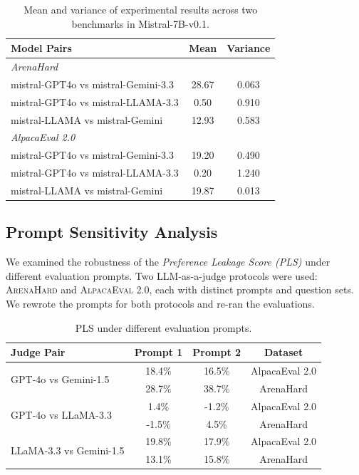 \documentclass{article} %
\begin{document}
\begin{table}[ht]
\centering
\caption{Mean and variance of experimental results across two benchmarks in Mistral-7B-v0.1.}
\label{tab:stability_results}
\begin{tabular}{lcc}
\toprule
\textbf{Model Pairs} & \textbf{Mean} & \textbf{Variance} \\
\midrule
\multicolumn{3}{l}{\textit{ArenaHard}} \\
mistral-GPT4o vs mistral-Gemini-3.3 & 28.67 & 0.063 \\
mistral-GPT4o vs mistral-LLAMA-3.3  &  0.50 & 0.910 \\
mistral-LLAMA vs mistral-Gemini     & 12.93 & 0.583 \\
\midrule
\multicolumn{3}{l}{\textit{AlpacaEval 2.0}} \\
mistral-GPT4o vs mistral-Gemini-3.3 & 19.20 & 0.490 \\
mistral-GPT4o vs mistral-LLAMA-3.3  &  0.20 & 1.240 \\
mistral-LLAMA vs mistral-Gemini     & 19.87 & 0.013 \\
\bottomrule
\end{tabular}
\label{tab:repeat}
\end{table}

\subsection{Prompt Sensitivity Analysis}
\label{app:prompt_sensitivity}
We examined the robustness of the \emph{Preference Leakage Score (PLS)} under different evaluation prompts.  
Two LLM-as-a-judge protocols were used: \textsc{ArenaHard} and \textsc{AlpacaEval 2.0}, each with distinct prompts and question sets.  
We rewrote the prompts for both protocols and re-ran the evaluations.

\begin{table}[h]
\centering
\caption{PLS under different evaluation prompts.}
\small
\begin{tabular}{lccc}
\toprule
Judge Pair & Prompt 1 & Prompt 2 & Dataset \\
\midrule
\multirow{2}{*}{GPT-4o vs Gemini-1.5} & 18.4\% & 16.5\% & AlpacaEval 2.0 \\
 & 28.7\% & 38.7\% & ArenaHard \\
\multirow{2}{*}{GPT-4o vs LLaMA-3.3} & 1.4\% & -1.2\% & AlpacaEval 2.0 \\
 & -1.5\% & 4.5\% & ArenaHard \\
\multirow{2}{*}{LLaMA-3.3 vs Gemini-1.5} & 19.8\% & 17.9\% & AlpacaEval 2.0 \\
 & 13.1\% & 15.8\% & ArenaHard \\
\bottomrule
\end{tabular}
\end{table}
\end{document}
